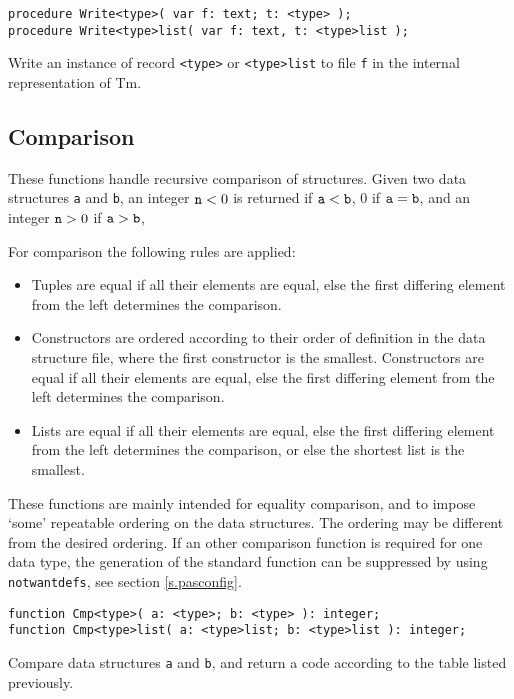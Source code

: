 \documentclass{article}
\newcommand{\Tm}{\sf Tm}
\newenvironment{desc}{\nopagebreak\vspace{-\bigskipamount}\vspace{-\parskip}\begin{list}{}{\setlength{\topsep}{0pt}\setlength{\rightmargin}{0pt}}\item[]}{\end{list}}
\begin{document}
\begin{verbatim}
procedure Write<type>( var f: text; t: <type> );
procedure Write<type>list( var f: text, t: <type>list );
\end{verbatim}
\begin{desc}
Write an instance of record {\tt <type>} or {\tt <type>list}
to file {\tt f} in the internal representation of {\Tm}.
\end{desc}
\subsection{Comparison}
These functions handle recursive comparison of structures.
Given two data structures {\tt a} and {\tt b},
an integer ${\tt n}<0$ is returned if ${\tt a}<{\tt b}$,
0 if ${\tt a}={\tt b}$,
and an integer ${\tt n}>0$ if ${\tt a}>{\tt b}$,
\par
For comparison the following rules are applied:
\begin{itemize}
\item
Tuples are equal if all their elements are equal,
else the first differing element from the left determines the comparison.
\item
Constructors are ordered according to their order of definition in the
data structure file,
where the first constructor is the smallest.
Constructors are equal if all their elements are equal,
else the first differing element from the left determines the comparison.
\item
Lists are equal if all their elements are equal,
else the first differing element from the left determines the comparison,
or else the shortest list is the smallest.
\end{itemize}
\par
These functions are mainly intended for equality comparison,
and to impose `some' repeatable ordering on the data structures.
The ordering may be different from the desired ordering.
If an other comparison function is required for one data type,
the generation of the standard function can be suppressed by
using {\tt notwantdefs}, see section \ref{s.pasconfig}.
\begin{verbatim}
function Cmp<type>( a: <type>; b: <type> ): integer;
function Cmp<type>list( a: <type>list; b: <type>list ): integer;
\end{verbatim}
\begin{desc}
Compare data structures {\tt a} and {\tt b}, and return a code
according to the table listed previously.
\end{desc}
\end{document}
